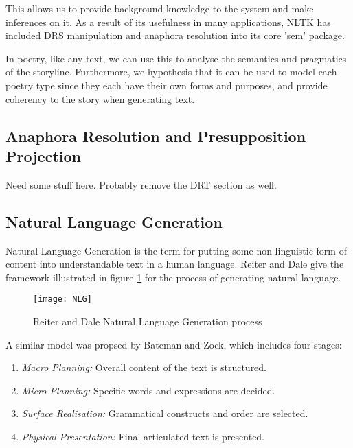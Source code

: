 This allows us to provide background knowledge to the system and make inferences on it. As a result of its usefulness in many applications, NLTK has included DRS manipulation and anaphora resolution into its core 'sem' package. 

In poetry, like any text, we can use this to analyse the semantics and pragmatics of the storyline. Furthermore, we hypothesis that it can be used to model each poetry type since they each have their own forms and purposes, and provide coherency to the story when generating text.

\subsection{Anaphora Resolution and Presupposition Projection}
\label{sec:arback}

Need some stuff here. Probably remove the DRT section as well.

\subsection{Natural Language Generation}
\label{sec:bg-nlg}
Natural Language Generation is the term for putting some non-linguistic form of content into understandable text in a human language. Reiter and Dale give the framework\cite{reiter2000building} illustrated in figure \ref{fig:nlg} for the process of generating natural language.

\begin{figure}[h!]
\centering
\texttt{[image: NLG]}
\caption{Reiter and Dale Natural Language Generation process}
\label{fig:nlg}
\end{figure}

A similar model was propsed by Bateman and Zock\cite{mitkov2003oxford}, which includes four stages:
\begin{enumerate}
\item{\textit{Macro Planning:} Overall content of the text is structured.}
\item{\textit{Micro Planning:} Specific words and expressions are decided.}
\item{\textit{Surface Realisation:} Grammatical constructs and order are selected.}
\item{\textit{Physical Presentation:} Final articulated text is presented.}
\end{enumerate}

